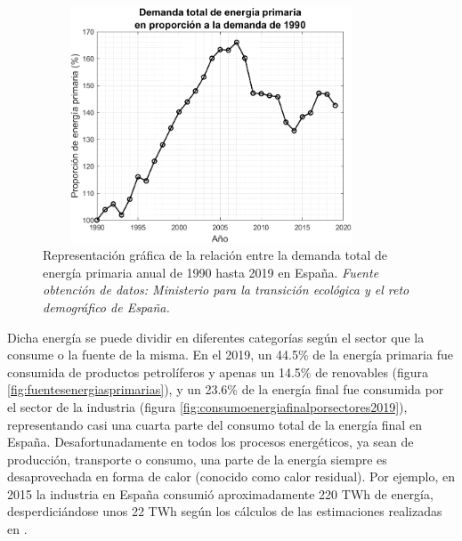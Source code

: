 \begin{figure}[H]
	\centering
	\includegraphics[width=10cm, height=7cm]{figuras/DemandaEnergiaPrimariaProporcion1990}
	\caption[Relación entre demanda total de energía primaria anual]{Representación gráfica de la relación entre la demanda total de energía primaria anual de 1990 hasta 2019 en España. \textit{Fuente obtención de datos: Ministerio para la transición ecológica y el reto demográfico de España.} }
	\label{fig:demandaenergiaprimariaproporcion1990}
\end{figure}
Dicha energía se puede dividir en diferentes categorías según el sector que la consume o la fuente de la misma. En el 2019, un 44.5\% de la energía primaria fue consumida de productos petrolíferos y apenas un 14.5\% de renovables (figura \ref{fig:fuentesenergiasprimarias}), y un 23.6\% de la energía final fue consumida por el sector de la industria (figura \ref{fig:consumoenergiafinalporsectores2019}), representando casi una cuarta parte del consumo total de la energía final en España. Desafortunadamente en todos los procesos energéticos, ya sean de producción, transporte o consumo, una parte de la energía siempre es desaprovechada en forma de calor (conocido como calor residual). Por ejemplo, en 2015 la industria en España consumió aproximadamente 220 TWh de energía, desperdiciándose unos 22 TWh según los cálculos de las estimaciones realizadas en \cite{wasteEnergyindustryEstimate}.

